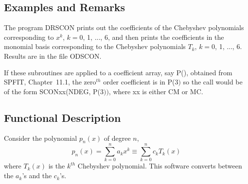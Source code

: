 \documentclass[twoside]{MATH77}
\begin{document}
\subsection{Examples and Remarks}

The program DRSCON prints out the coefficients of the Chebyshev polynomials
corresponding to $x^k$, $k = 0$, 1, ..., 6, and then prints the coefficients
in the monomial basis corresponding to the Chebyshev polynomials $T_k$, $k =
0$, 1, ..., 6. Results are in the file ODSCON.

If these subroutines are applied to a coefficient array, say P(), obtained
from SPFIT, Chapter~11.1, the zero$^{th}$ order coefficient is in P($3)$ so
the call would be of the form SCONxx(NDEG, P($3))$, where xx is either CM or
MC.

\subsection{Functional Description}

Consider the polynomial $p_n(x)$ of degree $n$,
\begin{equation}
\label{O1}p_n(x)=\sum_{k=0}^na_kx^k\equiv \sum_{k=0}^nc_kT_k(x)
\end{equation}
where $T_k(x)$ is the $k^{th}$ Chebyshev polynomial. This software
converts between the $a_k$'s and the $c_k$'s.
\end{document}
